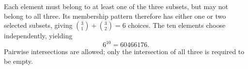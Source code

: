 Each element must belong to at least one of the three subsets, but may not belong to all three. Its membership pattern therefore has either one or two selected subsets, giving $\binom31+\binom32=6$ choices. The ten elements choose independently, yielding
\[
\boxed{6^{10}=60466176}.
\]
Pairwise intersections are allowed; only the intersection of all three is required to be empty.
